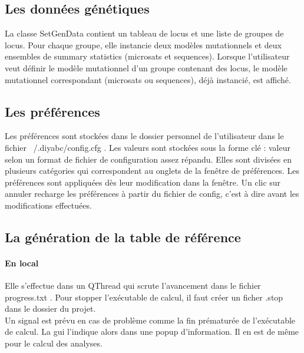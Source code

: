 \documentclass[12pt,a4paper]{article}
\begin{document}
    \subsection{Les données génétiques}
        La classe SetGenData contient un tableau de locus et une liste de
        groupes de locus. Pour chaque groupe, elle instancie deux modèles
        mutationnels et deux ensembles de summary statistics (microsats et
        sequences). Lorsque l'utilisateur veut définir le modèle mutationnel
        d'un groupe contenant des locus, le modèle mutationnel correspondant
        (microsats ou sequences), déjà instancié, est affiché.

    \subsection{Les préférences}
        Les préférences sont stockées dans le dossier personnel de
        l'utilisateur dans le fichier ~/.diyabc/config.cfg .
        Les valeurs sont stockées sous la forme clé
        : valeur selon un format de fichier de configuration assez répandu.
        Elles sont divisées en plusieurs catégories qui correspondent au onglets
        de la fenêtre de préférences.
        Les préférences sont
        appliquées dès leur modification dans la fenêtre. Un clic sur annuler
        recharge les préférences à partir du fichier de config, c'est à dire
        avant les modifications effectuées.
        

    \subsection{La génération de la table de référence}
        \paragraph{En local}
        Elle s'effectue dans un QThread qui scrute l'avancement dans le fichier
        progress.txt . Pour stopper l'exécutable de calcul, il faut créer un
        ficher .stop dans le dossier du projet.\\

        Un signal est prévu en cas de problème comme la fin prématurée de
        l'exécutable de calcul. La gui l'indique alors dans une popup
        d'information.  Il en est de même pour le calcul des analyses.
\end{document}
